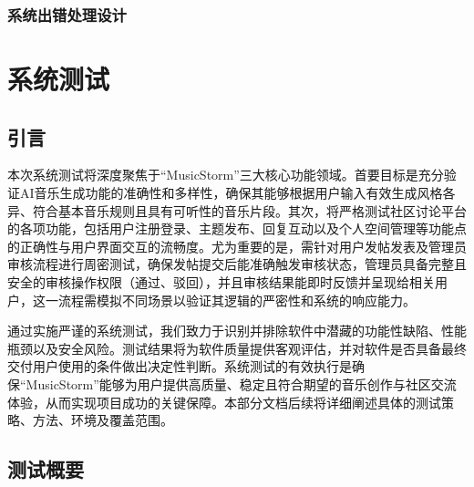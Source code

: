 \documentclass{base}
\numberwithin{figure}{section} %
\begin{document}
\subsubsection{系统出错处理设计}


\newpage

\section{系统测试}

\subsection{引言}

本次系统测试将深度聚焦于“MusicStorm”三大核心功能领域。首要目标是充分验证AI音乐生成功能的准确性和多样性，确保其能够根据用户输入有效生成风格各异、符合基本音乐规则且具有可听性的音乐片段。其次，将严格测试社区讨论平台的各项功能，包括用户注册登录、主题发布、回复互动以及个人空间管理等功能点的正确性与用户界面交互的流畅度。尤为重要的是，需针对用户发帖发表及管理员审核流程进行周密测试，确保发帖提交后能准确触发审核状态，管理员具备完整且安全的审核操作权限（通过、驳回），并且审核结果能即时反馈并呈现给相关用户，这一流程需模拟不同场景以验证其逻辑的严密性和系统的响应能力。

通过实施严谨的系统测试，我们致力于识别并排除软件中潜藏的功能性缺陷、性能瓶颈以及安全风险。测试结果将为软件质量提供客观评估，并对软件是否具备最终交付用户使用的条件做出决定性判断。系统测试的有效执行是确保“MusicStorm”能够为用户提供高质量、稳定且符合期望的音乐创作与社区交流体验，从而实现项目成功的关键保障。本部分文档后续将详细阐述具体的测试策略、方法、环境及覆盖范围。

\subsection{测试概要}
\end{document}
